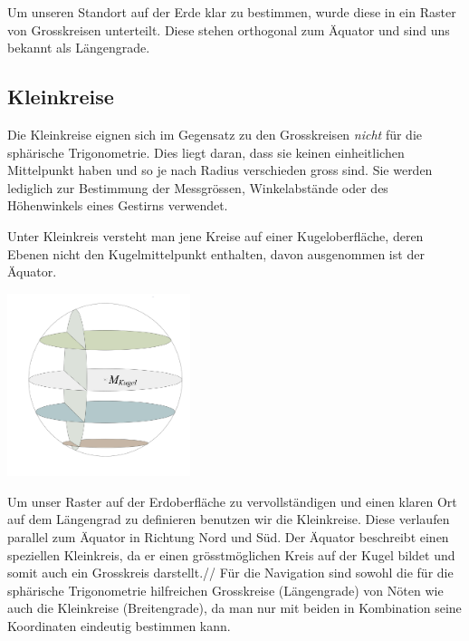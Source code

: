 \begin{refsection}
\begin{refsection}
Um unseren Standort auf der Erde klar zu bestimmen, wurde diese in ein Raster von Grosskreisen unterteilt. Diese stehen orthogonal zum Äquator und sind uns bekannt als Längengrade.


\subsection{Kleinkreise}
Die Kleinkreise eignen sich im Gegensatz zu den Grosskreisen \textit{nicht} für die sphärische Trigonometrie.  Dies liegt daran, dass sie keinen einheitlichen Mittelpunkt haben und so je nach Radius verschieden gross sind.
Sie werden lediglich zur Bestimmung der Messgrössen, Winkelabstände oder des Höhenwinkels eines Gestirns verwendet. 

\begin{definition}
Unter Kleinkreis versteht man jene Kreise auf einer Kugeloberfläche, deren Ebenen nicht den Kugelmittelpunkt enthalten, davon ausgenommen ist der Äquator.
\label{skript:kugel:satz:Kleinkreis}
\end{definition} 

\begin{center}
        \includegraphics[width=0.4\textwidth]{kugel/_Kleinkreis.jpg}
\end{center}

Um unser Raster auf der Erdoberfläche zu vervollständigen und einen klaren Ort auf dem Längengrad zu definieren benutzen wir die Kleinkreise. Diese verlaufen parallel zum Äquator in Richtung Nord und Süd. Der Äquator beschreibt einen speziellen Kleinkreis, da er einen grösstmöglichen Kreis auf der Kugel bildet und somit auch ein Grosskreis darstellt.//
Für die Navigation sind sowohl die für die sphärische Trigonometrie hilfreichen Grosskreise (Längengrade) von Nöten wie auch die Kleinkreise (Breitengrade), da man nur mit beiden in Kombination seine Koordinaten eindeutig bestimmen kann.




\end{refsection}
\end{refsection}
